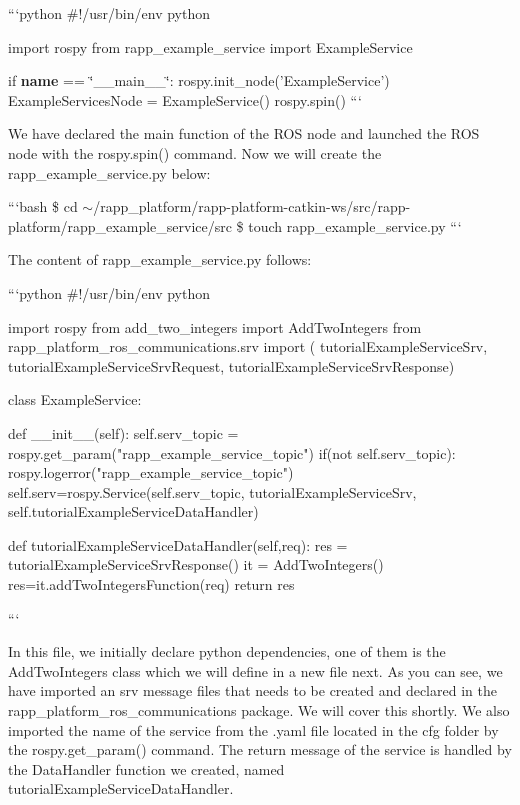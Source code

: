 ```python \#!/usr/bin/env python

import rospy from rapp\-\_\-example\-\_\-service import Example\-Service

if {\bfseries name} == \char`\"{}\-\_\-\-\_\-main\-\_\-\-\_\-\char`\"{}\-: rospy.\-init\-\_\-node('Example\-Service') Example\-Services\-Node = Example\-Service() rospy.\-spin() ```

We have declared the main function of the R\-O\-S node and launched the R\-O\-S node with the rospy.\-spin() command. Now we will create the {\ttfamily rapp\-\_\-example\-\_\-service.\-py} below\-:

```bash \$ cd $\sim$/rapp\-\_\-platform/rapp-\/platform-\/catkin-\/ws/src/rapp-\/platform/rapp\-\_\-example\-\_\-service/src \$ touch rapp\-\_\-example\-\_\-service.\-py ```

The content of {\ttfamily rapp\-\_\-example\-\_\-service.\-py} follows\-:

```python \#!/usr/bin/env python

import rospy from add\-\_\-two\-\_\-integers import Add\-Two\-Integers from rapp\-\_\-platform\-\_\-ros\-\_\-communications.\-srv import ( tutorial\-Example\-Service\-Srv, tutorial\-Example\-Service\-Srv\-Request, tutorial\-Example\-Service\-Srv\-Response)

class Example\-Service\-: \begin{DoxyVerb}def __init__(self):
    self.serv_topic = rospy.get_param("rapp_example_service_topic")
    if(not self.serv_topic):
        rospy.logerror("rapp_example_service_topic")
    self.serv=rospy.Service(self.serv_topic, tutorialExampleServiceSrv, self.tutorialExampleServiceDataHandler)

def tutorialExampleServiceDataHandler(self,req):
    res = tutorialExampleServiceSrvResponse()
    it = AddTwoIntegers()
    res=it.addTwoIntegersFunction(req)
    return res
\end{DoxyVerb}
 ```

In this file, we initially declare python dependencies, one of them is the Add\-Two\-Integers class which we will define in a new file next. As you can see, we have imported an srv message files that needs to be created and declared in the rapp\-\_\-platform\-\_\-ros\-\_\-communications package. We will cover this shortly. We also imported the name of the service from the .yaml file located in the cfg folder by the rospy.\-get\-\_\-param() command. The return message of the service is handled by the Data\-Handler function we created, named tutorial\-Example\-Service\-Data\-Handler.

